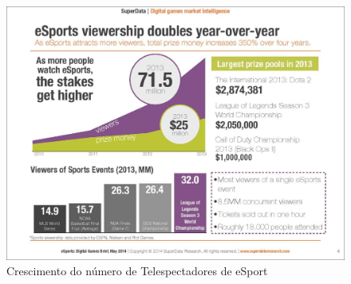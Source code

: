 \documentclass[a4paper, 12pt]{paper}
\begin{document}
\begin{figure}[!ht]
	\centering
	\includegraphics[scale=0.5]{img/img01.png}
	\caption{Crescimento do número de Telespectadores de eSport}	
\end{figure}
	
\end{document}
